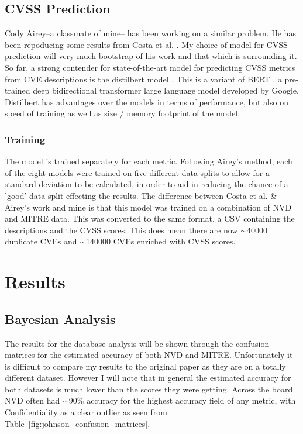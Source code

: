 \documentclass[12pt]{article}
\begin{document}
\subsection{CVSS Prediction}

Cody Airey--a classmate of mine-- has been working on a similar problem. He has been repoducing some
results from Costa et al. \cite{costa}. My choice of model for CVSS prediction will very much
bootstrap of his work and that which is surrounding it. So far, a strong contender for
state-of-the-art model for predicting CVSS metrics from CVE descriptions is the distilbert
model \cite{distilbert}. This is a variant of BERT \cite{BERT}, a pre-trained deep bidirectional
transformer large language model developed by Google. Distilbert has advantages over the models in
terms of performance, but also on speed of training as well as size / memory footprint of the
model.

\subsubsection{Training}

The model is trained separately for each metric. Following Airey's method, each of the eight models
were trained on five different data splits to allow for a standard deviation to be calculated, in
order to aid in reducing the chance of a 'good' data split effecting the results. The difference
between Costa et al. \& Airey's work and mine is that this model was trained on a combination of NVD and MITRE
data. This was converted to the same format, a CSV containing the descriptions and the CVSS scores.
This does mean there are now $\sim$40000 duplicate CVEs and $\sim$140000 CVEs enriched with CVSS
scores.

\section{Results}

\subsection{Bayesian Analysis}

The results for the database analysis will be shown through the confusion matrices for the estimated
accuracy of both NVD and MITRE. Unfortunately it is difficult to compare my results to the original
paper as they are on a totally different dataset. However I will note that in general the estimated
accuracy for both datasets is much lower than the scores they were getting. Across the board NVD
often had $\sim$90\% accuracy for the highest accuracy field of any metric, with Confidentiality as
a clear outlier as seen from Table~\ref{fig:johnson_confusion_matrices}.
\end{document}
